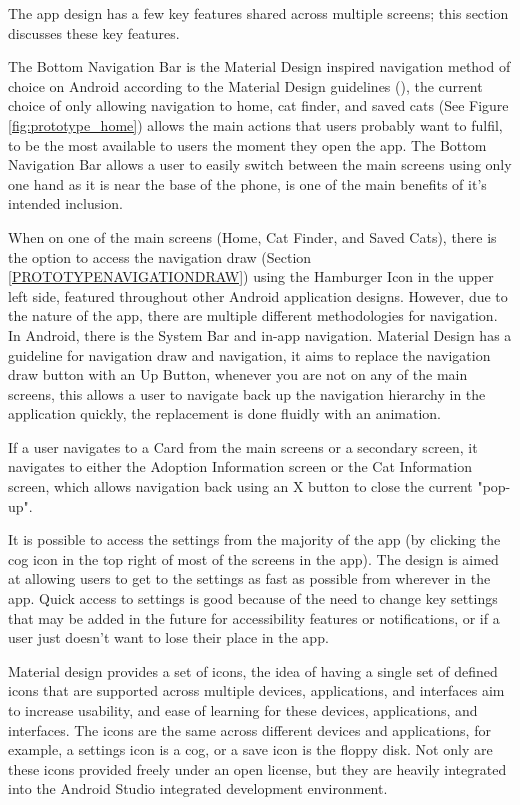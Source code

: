 The app design has a few key features shared across multiple screens; this section discusses these key features.

The \gls{Bottom Navigation Bar} is the Material Design inspired navigation method of choice on Android according to the Material Design guidelines (\cite{MATERIALDESIGNGUIDELINES}), the current choice of only allowing navigation to home, cat finder, and saved cats (See Figure \ref{fig:prototype_home}) allows the main actions that users probably want to fulfil, to be the most available to users the moment they open the app. The \gls{Bottom Navigation Bar} allows a user to easily switch between the main screens using only one hand as it is near the base of the phone, is one of the main benefits of it's intended inclusion.

When on one of the main screens (Home, Cat Finder, and Saved Cats), there is the option to access the navigation draw (Section \ref{PROTOTYPENAVIGATIONDRAW}) using the \gls{Hamburger Icon} in the upper left side, featured throughout other Android application designs. However, due to the nature of the app, there are multiple different methodologies for navigation. In Android, there is the \gls{System Bar} and in-app navigation. Material Design has a guideline for navigation draw and navigation, it aims to replace the navigation draw button with an \gls{Up Button}, whenever you are not on any of the main screens, this allows a user to navigate back up the navigation hierarchy in the application quickly, the replacement is done fluidly with an animation. 

If a user navigates to a \gls{Card} from the main screens or a secondary screen, it navigates to either the Adoption Information screen or the Cat Information screen, which allows navigation back using an X button to close the current "pop-up".

It is possible to access the settings from the majority of the app (by clicking the cog icon in the top right of most of the screens in the app). The design is aimed at allowing users to get to the settings as fast as possible from wherever in the app. Quick access to settings is good because of the need to change key settings that may be added in the future for accessibility features or notifications, or if a user just doesn't want to lose their place in the app.

Material design provides a set of icons, the idea of having a single set of defined icons that are supported across multiple devices, applications, and interfaces aim to increase usability, and ease of learning for these devices, applications, and interfaces. The icons are the same across different devices and applications, for example, a settings icon is a cog, or a save icon is the floppy disk. Not only are these icons provided freely under an open license, but they are heavily integrated into the Android Studio integrated development environment.

